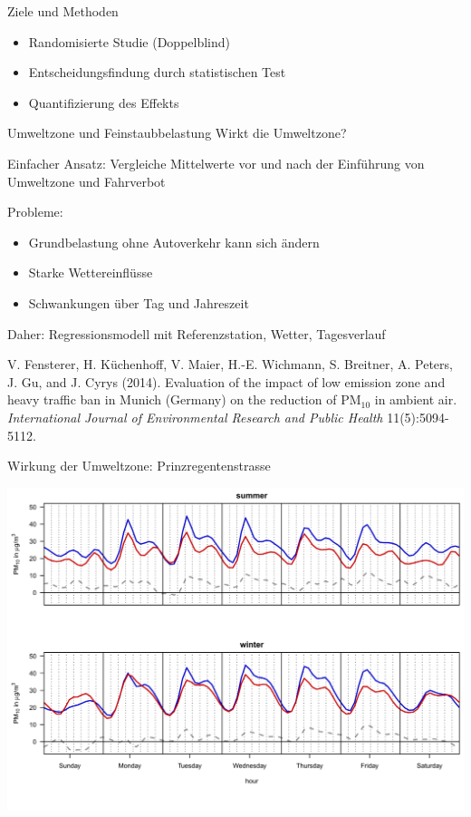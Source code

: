 \documentclass[
  10pt,
  ignorenonframetext,
]{beamer}
\providecommand{\tightlist}{%
  \setlength{\itemsep}{0pt}\setlength{\parskip}{0pt}}
\begin{document}
\begin{frame}{Ziele und Methoden}
\label{ziele-und-methoden}
\begin{itemize}
\tightlist
\item
  Randomisierte Studie (Doppelblind)
\item
  Entscheidungsfindung durch statistischen Test
\item
  Quantifizierung des Effekts
\end{itemize}
\end{frame}

\begin{frame}{Umweltzone und Feinstaubbelastung}
\label{umweltzone-und-feinstaubbelastung}
Wirkt die Umweltzone?

Einfacher Ansatz: Vergleiche Mittelwerte vor und nach der Einführung von
Umweltzone und Fahrverbot

Probleme:

\begin{itemize}
\tightlist
\item
  Grundbelastung ohne Autoverkehr kann sich ändern
\item
  Starke Wettereinflüsse
\item
  Schwankungen über Tag und Jahreszeit
\end{itemize}

Daher: Regressionsmodell mit Referenzstation, Wetter, Tagesverlauf

\scriptsize

V. Fensterer, H. Küchenhoff, V. Maier, H.-E. Wichmann, S. Breitner, A.
Peters, J. Gu, and J. Cyrys (2014). Evaluation of the impact of low
emission zone and heavy traffic ban in Munich (Germany) on the reduction
of PM\(_{10}\) in ambient air. \emph{International Journal of
Environmental Research and Public Health} 11(5):5094-5112.
\end{frame}

\begin{frame}{Wirkung der Umweltzone: Prinzregentenstrasse}
\label{wirkung-der-umweltzone-prinzregentenstrasse}
\begin{center}
\includegraphics[height = .8\textheight]{pics/0-ex6-umweltzone-prinzregenten.png}
\end{center}
\end{frame}
\end{document}
